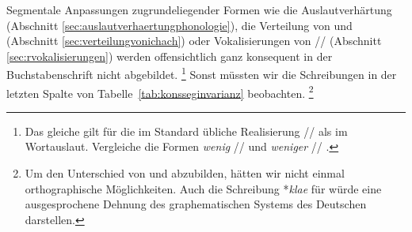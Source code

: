 \begin{table}
  \centering
  \caption{Invarianz zugrundeliegender Konsonanten-Segmente in der deutschen Buchstabenschrift}
  \label{tab:konsseginvarianz}
\end{table}

Segmentale Anpassungen zugrundeliegender Formen wie die Auslautverhärtung (Abschnitt \ref{sec:auslautverhaertungphonologie}), die Verteilung von \textipa{[\c{c}]} und \textipa{[X]} (Abschnitt \ref{sec:verteilungvonichach}) oder Vokalisierungen von // (Abschnitt \ref{sec:rvokalisierungen}) werden offensichtlich ganz konsequent in der Buchstabenschrift nicht abgebildet.%
\footnote{Das gleiche gilt für die im Standard übliche Realisierung // als \textipa{[I\c{c}]} im Wortauslaut.
Vergleiche die Formen \textit{wenig} // \textipa{[ve:nI\c{c}]} und \textit{weniger} // \textipa{[ve:nIg5]}.}
Sonst müssten wir die Schreibungen in der letzten Spalte von Tabelle~\ref{tab:konsseginvarianz} beobachten.%
\footnote{Um den Unterschied von \textipa{[\c{c}]} und \textipa{[X]} abzubilden, hätten wir nicht einmal orthographische Möglichkeiten.
Auch die Schreibung *\textit{klae} für \textipa{[kl\t{a@}]} würde eine ausgesprochene Dehnung des graphematischen Systems des Deutschen darstellen.}

